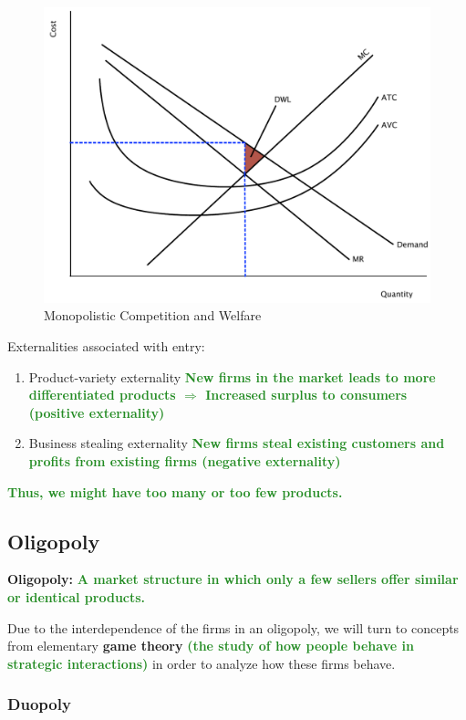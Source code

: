 \documentclass[11pt]{article}\usepackage[]{graphicx}\usepackage[]{color}
\theoremstyle{definition}
\newcommand{\ddp}[1]{{\textbf{\textcolor{ForestGreen}{#1}}}}
\newcommand{\defn}[1]{\textbf{#1}}
\begin{document}
		\begin{figure}[H]
			\centering
			\includegraphics[scale=.40]{plot82.pdf}
			\caption{Monopolistic Competition and Welfare}
		\end{figure}
	
	Externalities associated with entry:
	\begin{enumerate}
		\item Product-variety externality \ddp{New firms in the market leads to more differentiated products $\Rightarrow$ Increased surplus to consumers (positive externality)}
		\item Business stealing externality \ddp{New firms steal existing customers and profits from existing firms (negative externality)}
	\end{enumerate}
	\ddp{Thus, we might have too many or too few products.}
	
	
	\subsection{Oligopoly}
	
	\defn{Oligopoly:} \ddp{A market structure in which only a few sellers offer similar or identical products.\\}
	
	Due to the interdependence of the firms in an oligopoly, we will turn to concepts from elementary \textbf{game theory} \ddp{(the study of how people behave in strategic interactions)} in order to analyze how these firms behave. 
	
	
	
	
	\subsubsection*{Duopoly}
\end{document}
